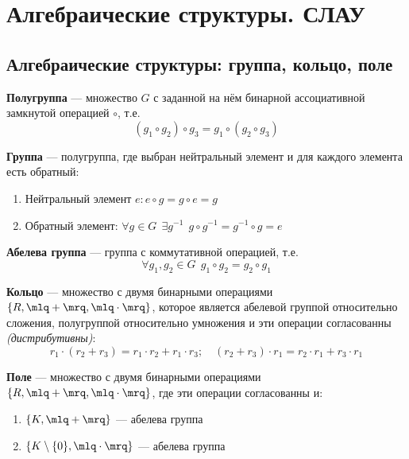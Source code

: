 \section{Алгебраические структуры. СЛАУ}
\subsection{Алгебраические структуры: группа, кольцо, поле}
\begin{definition}
    \textbf{Полугруппа} --- множество $G$ с заданной на нём бинарной ассоциативной замкнутой операцией $\circ$, т.е. $$(g_1\circ g_2)\circ g_3 = g_1\circ (g_2 \circ g_3)$$
\end{definition}
\begin{definition}
    \textbf{Группа} --- полугруппа, где выбран нейтральный элемент и для каждого элемента есть обратный:
    \begin{enumerate}
        \item Нейтральный элемент $e: e\circ g=g\circ e=g$
        \item Обратный элемент: $\forall g\in G \ \ \exists g^{-1} \ \ g\circ g^{-1}=g^{-1}\circ g=e$
    \end{enumerate}
\end{definition}
\begin{definition}
    \textbf{Абелева группа} --- группа с коммутативной операцией, т.е. $$\forall g_1, g_2\in G \ \ g_1\circ g_2=g_2\circ g_1$$
\end{definition}
\begin{definition}
    \textbf{Кольцо} --- множество с двумя бинарными операциями $\{R, \mlq+\mrq, \mlq\cdot\mrq\}$, которое является абелевой группой относительно сложения, полугруппой относительно умножения и эти операции согласованны \textit{(дистрибутивны)}:
    $$r_1\cdot(r_2+r_3)=r_1\cdot r_2+r_1\cdot r_3;\quad (r_2+r_3)\cdot r_1=r_2\cdot r_1+r_3\cdot r_1$$
\end{definition}
\begin{definition}
    \textbf{Поле} --- множество с двумя бинарными операциями $\{R, \mlq+\mrq, \mlq\cdot\mrq\}$, где эти операции согласованны и:
    \begin{enumerate}
        \item $\{K, \mlq + \mrq\}$ --- абелева группа
        \item $\{K\setminus\{0\}, \mlq \cdot \mrq\}$ --- абелева группа
    \end{enumerate}
\end{definition}
